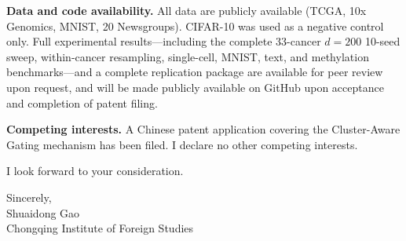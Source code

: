 \documentclass[12pt,a4paper]{article}
\begin{document}
\noindent\textbf{Data and code availability.} All data are publicly available (TCGA, 10x Genomics, MNIST, 20 Newsgroups). CIFAR-10 was used as a negative control only. Full experimental results---including the complete 33-cancer $d{=}200$ 10-seed sweep, within-cancer resampling, single-cell, MNIST, text, and methylation benchmarks---and a complete replication package are available for peer review upon request, and will be made publicly available on GitHub upon acceptance and completion of patent filing.

\noindent\textbf{Competing interests.} A Chinese patent application covering the Cluster-Aware Gating mechanism has been filed. I declare no other competing interests.

\vspace{1cm}
\noindent I look forward to your consideration.

\vspace{0.5cm}
\noindent Sincerely,\\
\vspace{0.3cm}
\noindent Shuaidong Gao\\
\noindent Chongqing Institute of Foreign Studies
\end{document}

